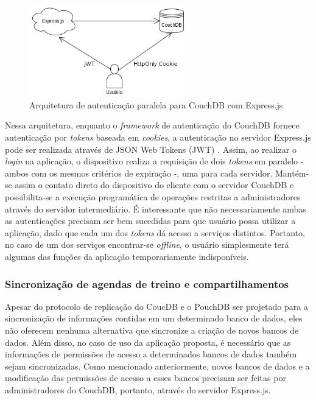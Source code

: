 \documentclass[
	article,			%
	11pt,				%
	oneside,			%
	a4paper,			%
	english,			%
	brazil,				%
	sumario=tradicional
	]{abntex2}
\begin{document}
\begin{figure}[H]
	\centering
	\caption{Arquitetura de autenticação paralela para CouchDB com Express.js}
	\includegraphics[width=0.6\textwidth]{figures/couchdb-express-proxy-scheme-update}
\end{figure}

Nessa arquitetura, enquanto o \textit{framework} de autenticação do CouchDB fornece autenticação por \textit{tokens} baseada em \textit{cookies}, a autenticação no servidor Express.js pode ser realizada através de JSON Web Tokens (JWT) \cite{jwt-2017}. Assim, ao realizar o \textit{login} na aplicação, o dispositivo realiza a requisição de dois \textit{tokens} em paralelo - ambos com os mesmos critérios de expiração -, uma para cada servidor. Mantém-se assim o contato direto do dispositivo do cliente com o servidor CouchDB e possibilita-se a execução programática de operações restritas a administradores através do servidor intermediário. É interessante que não necessariamente ambas as autenticações precisam ser bem sucedidas para que usuário possa utilizar a aplicação, dado que cada um dos \textit{tokens} dá acesso a serviços distintos. Portanto, no caso de um dos serviços encontrar-se \textit{offline}, o usuário simplesmente terá algumas das funções da aplicação temporariamente indisponíveis.

\subsubsection{Sincronização de agendas de treino e compartilhamentos}

Apesar do protocolo de replicação do CoucDB e o PouchDB ser projetado para a sincronização de informações contidas em um determinado banco de dados, eles não oferecem nenhuma alternativa que sincronize a criação de novos bancos de dados. Além disso, no caso de uso da aplicação proposta, é necessário que as informações de permissões de acesso a determinados bancos de dados também sejam sincronizadas. Como mencionado anteriormente, novos bancos de dados e a modificação das permissões de acesso a esses bancos precisam ser feitas por administradores do CouchDB, portanto, através do servidor Express.js.
\end{document}
